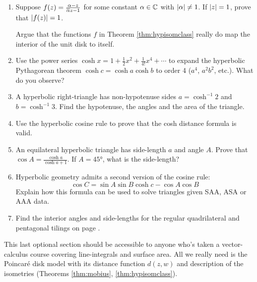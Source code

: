 \begin{exercises}
\begin{enumerate}
	  
	  \item Suppose $f(z)=\frac{\alpha-z}{\overline{\alpha} z-1}$ for some constant $\alpha\in\mathbb{C}$ with $\left| \alpha\right|\neq 1$. If $\left| z\right|=1$, prove that $\left| f(z)\right|=1$.\par
	  Argue that the functions $f$ in Theorem \ref{thm:hypisomclass} really do map the interior of the unit disk to itself.
	  
	  
		\item Use the power series $\cosh x=1+\frac 12x^2+\frac 1{4!}x^4+\cdots$ to expand the hyperbolic Pythagorean theorem $\cosh c=\cosh a\cosh b$ to order 4 ($a^4$, $a^2b^2$, etc.). What do you observe?
	
	  
	  \item A hyperbolic right-triangle has non-hypotenuse sides $a=\cosh^{-1}2$ and $b=\cosh^{-1}3$. Find the hypotenuse, the angles and the area of the triangle.
	  
	  
		\item Use the hyperbolic cosine rule to prove that the cosh distance formula is valid.
		
		\item An equilateral hyperbolic triangle has side-length $a$ and angle $A$. Prove that $\cos A=\frac{\cosh a}{\cosh a+1}$. If $A=\ang{45}$, what is the side-length?
		
		
		\item\label{exs:hcosruleII} Hyperbolic geometry admits a second version of the cosine rule:
		\[
			\cos C=\sin A\sin B\cosh c-\cos A\cos B
		\]
		Explain how this formula can be used to solve triangles given SAA, ASA or AAA data.
		
		\item Find the interior angles and side-lengths for the regular quadrilateral and pentagonal tilings on page \pageref{pg:hyptiling}.
	\end{enumerate}
\end{exercises}



\vfil\goodbreak






This last optional section should be accessible to anyone who's taken a vector-calculus course covering line-integrals and surface area. All we really need is the Poincaré disk model with its distance function $d(z,w)$ and description of the isometries (Theorems \ref{thm:mobius}, \ref{thm:hypisomclass}).\smallbreak

